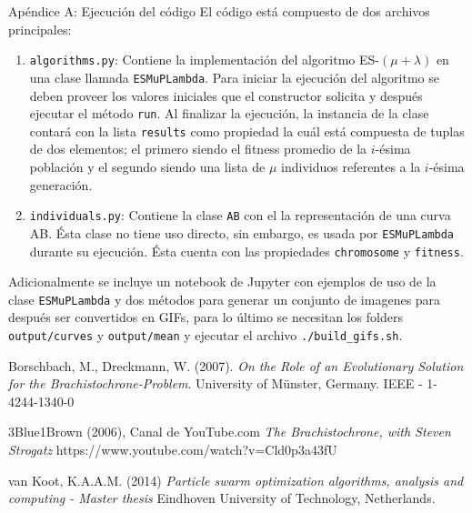 \documentclass[10pt, letterpaper]{article}
\theoremstyle{definition}
\begin{document}
\begin{section}{Apéndice A: Ejecución del código}
    El código está compuesto de dos archivos principales:
    \begin{enumerate}
        \item \texttt{algorithms.py}: Contiene la implementación del algoritmo
              ES-$(\mu + \lambda)$ en una clase llamada \texttt{ESMuPLambda}.
              Para iniciar la ejecución del algoritmo se deben proveer los valores
              iniciales que el constructor solicita y después ejecutar el método
              \texttt{run}. Al finalizar la ejecución, la instancia de la clase
              contará con la lista \texttt{results} como propiedad la cuál está
              compuesta de tuplas de dos elementos; el primero siendo el fitness
              promedio de la $i$-ésima población y el segundo siendo una lista
              de $\mu$ individuos referentes a la $i$-ésima generación.
        \item \texttt{individuals.py}: Contiene la clase \texttt{AB} con el
              la representación de una curva AB. Ésta clase no tiene uso directo,
              sin embargo, es usada por \texttt{ESMuPLambda} durante su ejecución.
              Ésta cuenta con las propiedades \texttt{chromosome} y \texttt{fitness}.
    \end{enumerate}
    Adicionalmente se incluye un notebook de Jupyter con ejemplos de uso
    de la clase \texttt{ESMuPLambda} y dos métodos para generar un conjunto
    de imagenes para después ser convertidos en GIFs, para lo último se necesitan
    los folders \texttt{output/curves} y \texttt{output/mean} y ejecutar el
    archivo \texttt{./build\_gifs.sh}.
\end{section}

\clearpage
\begin{thebibliography}{9}

      Borschbach, M., Dreckmann, W. (2007).
      \textit{On the Role of an Evolutionary Solution for the Brachistochrone-Problem}.
      University of Münster, Germany.
      IEEE - 1-4244-1340-0

        3Blue1Brown (2006), Canal de YouTube.com
        \textit{The Brachistochrone, with Steven Strogatz}
        \small{https://www.youtube.com/watch?v=Cld0p3a43fU}

        van Koot, K.A.A.M. (2014)
        \textit{Particle swarm optimization algorithms, analysis and computing - Master thesis}
        Eindhoven University of Technology, Netherlands.
\end{thebibliography}
\end{document}
